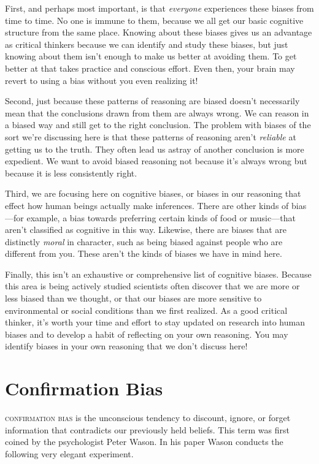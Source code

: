First, and perhaps most important, is that \emph{everyone} experiences these biases from time to time. No one is immune to them, because we all get our basic cognitive structure from the same place. Knowing about these biases gives us an advantage as critical thinkers because we can identify and study these biases, but just knowing about them isn't enough to make us better at avoiding them. To get better at that takes practice and conscious effort. Even then, your brain may revert to using a bias without you even realizing it!

Second, just because these patterns of reasoning are biased doesn't necessarily mean that the conclusions drawn from them are always wrong. We can reason in a biased way and still get to the right conclusion. The problem with biases of the sort we're discussing here is that these patterns of reasoning aren't \emph{reliable} at getting us to the truth. They often lead us astray of another conclusion is more expedient. We want to avoid biased reasoning not because it's always wrong but because it is less consistently right.

Third, we are focusing here on cognitive biases, or biases in our reasoning that effect how human beings actually make inferences. There are other kinds of bias---for example, a bias towards preferring certain kinds of food or music---that aren't classified as cognitive in this way. Likewise, there are biases that are distinctly \emph{moral} in character, such as being biased against people who are different from you. These aren't the kinds of biases we have in mind here.

Finally, this isn't an exhaustive or comprehensive list of cognitive biases. Because this area is being actively studied scientists often discover that we are more or less biased than we thought, or that our biases are more sensitive to environmental or social conditions than we first realized. As a good critical thinker, it's worth your time and effort to stay updated on research into human biases and to develop a habit of reflecting on your own reasoning. You may identify biases in your own reasoning that we don't discuss here!

\section{Confirmation Bias}

\textsc{\Gls{confirmation bias}} is the unconscious tendency to discount, ignore, or forget information that contradicts our previously held beliefs. This term was first coined by the psychologist Peter Wason.\cite{wason1960} In his paper Wason conducts the following very elegant experiment.

